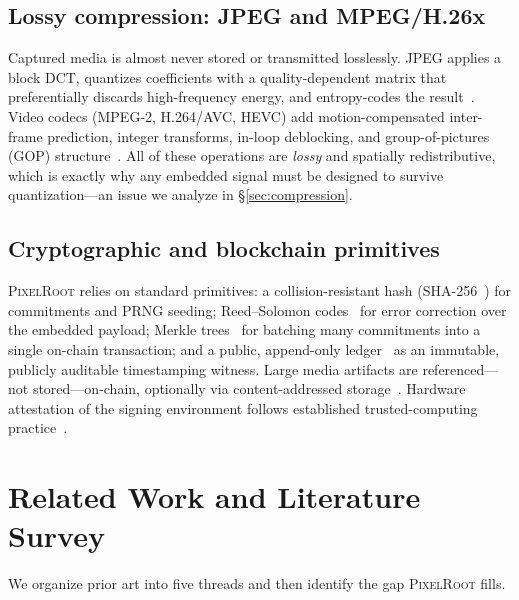 \documentclass[journal]{IEEEtran}
\newcommand{\pr}{\textup{\textsc{PixelRoot}}}
\begin{document}
\subsection{Lossy compression: JPEG and MPEG/H.26x}
Captured media is almost never stored or transmitted losslessly. JPEG applies a
block \mbox{DCT}, quantizes coefficients with a quality-dependent matrix that
preferentially discards high-frequency energy, and entropy-codes the
result~\cite{wallace1992jpeg}. Video codecs (MPEG-2, \mbox{H.264/AVC},
\mbox{HEVC}) add motion-compensated inter-frame prediction, integer transforms,
in-loop deblocking, and group-of-pictures (GOP)
structure~\cite{wiegand2003h264,sullivan2012hevc}. All of these operations are
\emph{lossy} and spatially redistributive, which is exactly why any embedded
signal must be designed to survive quantization---an issue we analyze in
\S\ref{sec:compression}.

\subsection{Cryptographic and blockchain primitives}
\pr{} relies on standard primitives: a collision-resistant hash
(\mbox{SHA-256}~\cite{nist2015sha}) for commitments and PRNG seeding;
Reed--Solomon codes~\cite{reed1960polynomial} for error correction over the
embedded payload; Merkle trees~\cite{merkle1987digital} for batching many
commitments into a single on-chain transaction; and a public, append-only
ledger~\cite{nakamoto2008bitcoin,wood2014ethereum} as an immutable, publicly
auditable timestamping witness. Large media artifacts are referenced---not
stored---on-chain, optionally via content-addressed
storage~\cite{benet2014ipfs}. Hardware attestation of the signing
environment follows established trusted-computing
practice~\cite{trustedcomputing,google2025c2pa}.

\fi
\section{Related Work and Literature Survey}\label{sec:related}
We organize prior art into five threads and then identify the gap \pr{} fills.

\ifshort
\else
\end{document}
